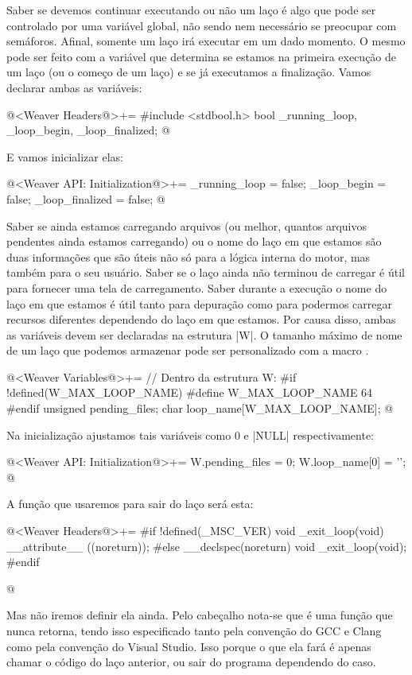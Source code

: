 Saber se devemos continuar executando ou não um laço é algo que pode
ser controlado por uma variável global, não sendo nem necessário se
preocupar com semáforos. Afinal, somente um laço irá executar em um
dado momento. O mesmo pode ser feito com a variável que determina se
estamos na primeira execução de um laço (ou o começo de um laço) e se
já executamos a finalização. Vamos declarar ambas as variáveis:

\iniciocodigo
@<Weaver Headers@>+=
#include <stdbool.h>
bool _running_loop, _loop_begin, _loop_finalized;
@
\fimcodigo

E vamos inicializar elas:

\iniciocodigo
@<Weaver API: Initialization@>+=
_running_loop = false;
_loop_begin = false;
_loop_finalized = false;
@
\fimcodigo

Saber se ainda estamos carregando arquivos (ou melhor, quantos
arquivos pendentes ainda estamos carregando) ou o nome do laço em que
estamos são duas informações que são úteis não só para a lógica
interna do motor, mas também para o seu usuário. Saber se o laço ainda
não terminou de carregar é útil para fornecer uma tela de
carregamento. Saber durante a execução o nome do laço em que estamos é
útil tanto para depuração como para podermos carregar recursos
diferentes dependendo do laço em que estamos. Por causa disso, ambas
as variáveis devem ser declaradas na estrutura |W|. O tamanho máximo
de nome de um laço que podemos armazenar pode ser personalizado com a
macro .

\iniciocodigo
@<Weaver Variables@>+=
// Dentro da estrutura W:
#if !defined(W_MAX_LOOP_NAME)
#define W_MAX_LOOP_NAME 64
#endif
unsigned pending_files;
char loop_name[W_MAX_LOOP_NAME];
@
\fimcodigo

Na inicialização ajustamos tais variáveis como 0 e |NULL|
respectivamente:

\iniciocodigo
@<Weaver API: Initialization@>+=
W.pending_files = 0;
W.loop_name[0] = '\0';
@
\fimcodigo

A função que usaremos para sair do laço será esta:

\iniciocodigo
@<Weaver Headers@>+=
#if !defined(_MSC_VER)
void _exit_loop(void) __attribute__ ((noreturn));
#else
__declspec(noreturn) void _exit_loop(void);
#endif


@
\fimcodigo

Mas não iremos definir ela ainda. Pelo cabeçalho nota-se que é uma
função que nunca retorna, tendo isso especificado tanto pela convenção
do GCC e Clang como pela convenção do Visual Studio. Isso porque o que
ela fará é apenas chamar o código do laço anterior, ou sair do
programa dependendo do caso.

